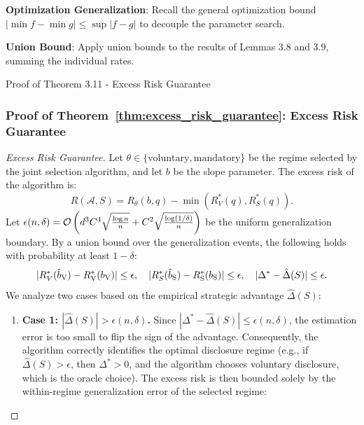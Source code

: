 \begin{guideblock}
\item \textbf{Optimization Generalization}: Recall the general optimization bound $|\min f - \min g| \le \sup |f - g|$ to decouple the parameter search.
\item \textbf{Union Bound}: Apply union bounds to the results of Lemmas 3.8 and 3.9, summing the individual rates.
\end{guideblock}


\begin{sourceblock}{Proof of Theorem 3.11 - Excess Risk Guarantee}
\subsubsection*{Proof of Theorem~\ref{thm:excess_risk_guarantee}: Excess Risk Guarantee}
\label{app:proof_excess_risk_guarantee}
\begin{proof}[Excess Risk Guarantee]
Let $\theta \in \{\mathrm{voluntary}, \mathrm{mandatory}\}$ be the regime selected by the joint selection algorithm, and let $b$ be the slope parameter. The excess risk of the algorithm is:
\begin{equation}
    R(\mathcal{A}, S) = R_\theta(b, q) - \min(R_V^*(q), R_S^*(q)).
\end{equation}
Let $\epsilon(n, \delta) = \mathcal{O}\left( d^3 C^4 \sqrt{\frac{\log n}{n}} + C^2 \sqrt{\frac{\log(1/\delta)}{n}} \right)$ be the uniform generalization boundary. By a union bound over the generalization events, the following holds with probability at least $1 - \delta$:
\begin{equation}
    \label{eq:gen_bounds_simult}
    |R_V^*(\hat{b}_{\mathrm{V}}) - R_{\mathrm{V}}^*(b_{\mathrm{V}})| \le \epsilon, \quad |R_S^*(\hat{b}_{\mathrm{S}}) - R_{\mathrm{S}}^*(b_{\mathrm{S}})| \le \epsilon, \quad |\Delta^* - \hat{\Delta}(S)| \le \epsilon.
\end{equation}
We analyze two cases based on the empirical strategic advantage $\hat{\Delta}(S)$:
\begin{enumerate}
    \item \textbf{Case 1: $|\hat{\Delta}(S)| > \epsilon(n, \delta)$.} 
    Since $|\Delta^* - \hat{\Delta}(S)| \le \epsilon(n, \delta)$, the estimation error is too small to flip the sign of the advantage. Consequently, the algorithm correctly identifies the optimal disclosure regime (e.g., if $\hat{\Delta}(S) > \epsilon$, then $\Delta^* > 0$, and the algorithm chooses voluntary disclosure, which is the oracle choice). The excess risk is then bounded solely by the within-regime generalization error of the selected regime:

\end{enumerate}
\end{proof}
\end{sourceblock}
